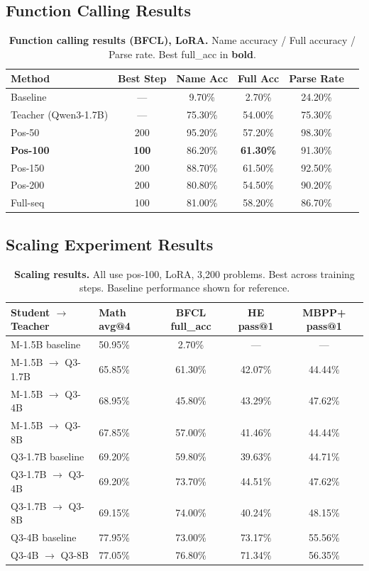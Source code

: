 \documentclass[10pt]{article}
\begin{document}
\subsection{Function Calling Results}

\begin{table}[!htbp]
\centering
\caption{\textbf{Function calling results (BFCL), LoRA.} Name accuracy / Full accuracy / Parse rate. Best full\_acc in \textbf{bold}.}
\label{tab:app_funcall}
\small
\begin{tabular}{lccccc}
\toprule
\textbf{Method} & \textbf{Best Step} & \textbf{Name Acc} & \textbf{Full Acc} & \textbf{Parse Rate} \\
\midrule
Baseline & --- & 9.70\% & 2.70\% & 24.20\% \\
Teacher (Qwen3-1.7B) & --- & 75.30\% & 54.00\% & 75.30\% \\
\midrule
Pos-50 & 200 & 95.20\% & 57.20\% & 98.30\% \\
\textbf{Pos-100} & \textbf{100} & 86.20\% & \textbf{61.30\%} & 91.30\% \\
Pos-150 & 200 & 88.70\% & 61.50\% & 92.50\% \\
Pos-200 & 200 & 80.80\% & 54.50\% & 90.20\% \\
Full-seq & 100 & 81.00\% & 58.20\% & 86.70\% \\
\bottomrule
\end{tabular}
\end{table}


\subsection{Scaling Experiment Results}

\begin{table}[!htbp]
\centering
\caption{\textbf{Scaling results.} All use pos-100, LoRA, 3,200 problems. Best across training steps. Baseline performance shown for reference.}
\label{tab:app_scaling}
\small
\begin{tabular}{llccc}
\toprule
\textbf{Student $\rightarrow$ Teacher} & \textbf{Math avg@4} & \textbf{BFCL full\_acc} & \textbf{HE pass@1} & \textbf{MBPP+ pass@1} \\
\midrule
M-1.5B baseline & 50.95\% & 2.70\% & --- & --- \\
M-1.5B $\rightarrow$ Q3-1.7B & 65.85\% & 61.30\% & 42.07\% & 44.44\% \\
M-1.5B $\rightarrow$ Q3-4B & 68.95\% & 45.80\% & 43.29\% & 47.62\% \\
M-1.5B $\rightarrow$ Q3-8B & 67.85\% & 57.00\% & 41.46\% & 44.44\% \\
\midrule
Q3-1.7B baseline & 69.20\% & 59.80\% & 39.63\% & 44.71\% \\
Q3-1.7B $\rightarrow$ Q3-4B & 69.20\% & 73.70\% & 44.51\% & 47.62\% \\
Q3-1.7B $\rightarrow$ Q3-8B & 69.15\% & 74.00\% & 40.24\% & 48.15\% \\
\midrule
Q3-4B baseline & 77.95\% & 73.00\% & 73.17\% & 55.56\% \\
Q3-4B $\rightarrow$ Q3-8B & 77.05\% & 76.80\% & 71.34\% & 56.35\% \\
\bottomrule
\end{tabular}
\end{table}
\end{document}
